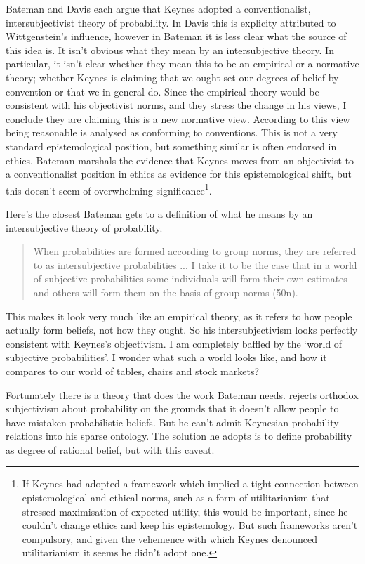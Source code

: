 Bateman and Davis each argue that Keynes adopted a conventionalist, intersubjectivist theory of probability. In Davis this is explicity attributed to Wittgenstein's influence, however in Bateman it is less clear what the source of this idea is. It isn't obvious what they mean by an intersubjective theory. In particular, it isn't clear whether they mean this to be an empirical or a normative theory; whether Keynes is claiming that we ought set our degrees of belief by convention or that we in general do. Since the empirical theory would be consistent with his objectivist norms, and they stress the change in his views, I conclude they are claiming this is a new normative view. According to this view being reasonable is analysed as conforming to conventions. This is not a very standard epistemological position, but something similar is often endorsed in ethics. Bateman marshals the evidence that Keynes moves from an objectivist to a conventionalist position in ethics as evidence for this epistemological shift, but this doesn't seem of overwhelming significance\footnote{If Keynes had adopted a framework which implied a tight connection between epistemological and ethical norms, such as a form of utilitarianism that stressed maximisation of expected utility, this would be important, since he couldn't change ethics and keep his epistemology. But such frameworks aren't compulsory, and given the vehemence with which Keynes denounced utilitarianism \citep[445]{KeynesMEB} it seems he didn't adopt one.}.

Here's the closest Bateman gets to a definition of what he means by an intersubjective theory of probability.

\begin{quote}
When probabilities are formed according to group norms, they are referred to as intersubjective probabilities ... I take it to be the case that in a world of subjective probabilities some individuals will form their own estimates and others will form them on the basis of group norms (50n).
\end{quote}

\noindent This makes it look very much like an empirical theory, as it refers to how people actually form beliefs, not how they ought. So his intersubjectivism looks perfectly consistent with Keynes's objectivism. I am completely baffled by the `world of subjective probabilities'. I wonder what such a world looks like, and how it compares to our world of tables, chairs and stock markets?

Fortunately there is a theory that does the work Bateman needs. \citet{Ayer1936} rejects orthodox subjectivism about probability on the grounds that it doesn't allow people to have mistaken probabilistic beliefs. But he can't admit Keynesian probability relations into his sparse ontology. The solution he adopts is to define probability as degree of rational belief, but with this caveat.

